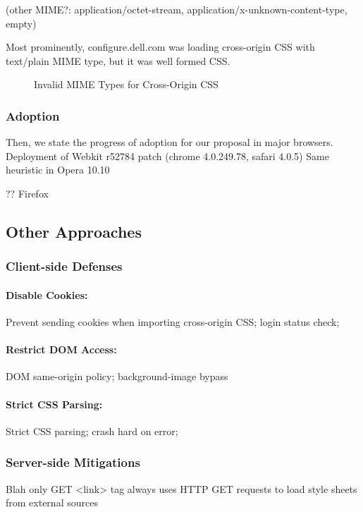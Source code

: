 \documentclass{acm_proc_article-sp}
\begin{document}
{(other MIME?: application/octet-stream, application/x-unknown-content-type, empty)

Most prominently, configure.dell.com was loading cross-origin CSS with text/plain MIME type, but it was well formed CSS.

\begin{figure}
\centering
{}
\caption{Invalid MIME Types for Cross-Origin CSS}
\end{figure}

\subsubsection{Adoption}
Then, we state the progress of adoption for our proposal in major browsers. 
Deployment of Webkit r52784 patch (chrome 4.0.249.78, safari 4.0.5)
Same heuristic in Opera 10.10

?? Firefox

\subsection{Other Approaches}

\subsubsection{Client-side Defenses}
\paragraph{Disable Cookies:}
Prevent sending cookies when importing cross-origin CSS;
login status check;

\paragraph{Restrict DOM Access:}
DOM same-origin policy;
background-image bypass

\paragraph{Strict CSS Parsing:}
Strict CSS parsing;
crash hard on error;

\subsubsection{Server-side Mitigations}
Blah
only GET
<link> tag always uses HTTP GET requests to load style sheets from external sources

}
\end{document}
